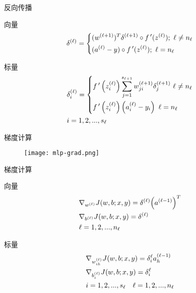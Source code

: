 \begin{frame}{反向传播}
\begin{block}{向量}
\[{\delta ^{(\ell)}} = \left\{ \begin{gathered}
  {({w^{(\ell + 1)}})^T}{\delta ^{(\ell + 1)}} \circ f\,'({z^{(\ell)}});{\text{  }}\ell \ne {n_\ell} \hfill \\
  ({a^{(\ell)}} - y) \circ f\,'({z^{(\ell)}}); {\text{  }}\ell = {n_\ell} \hfill \\ 
\end{gathered}  \right.\]
\end{block}

\begin{block}{标量}
\[\begin{gathered}
  \delta _i^{(\ell )} = \left\{ \begin{gathered}
  f\,'\left( {z_i^{(\ell )}} \right)\sum\limits_{j = 1}^{{s_{\ell  + 1}}} {w_{ji}^{(\ell  + 1)}\delta _j^{(\ell  + 1)}} {\text{   }}\ell  \ne {n_\ell } \hfill \\
  f\,'\left( {z_i^{(\ell )}} \right)\left( {a_i^{(\ell )} - {y_i}} \right){\text{       }}\ell  = {n_\ell } \hfill \\ 
\end{gathered}  \right. \hfill \\
  i = 1,2,...,{s_\ell } \hfill \\ 
\end{gathered} \]
\end{block}
\end{frame}

\begin{frame}{梯度计算}
  \begin{figure}
    \centering
    \texttt{[image: mlp-grad.png]}
  \end{figure}
\end{frame}

\begin{frame}{梯度计算}
\begin{block}{向量}
\[\begin{gathered}
  {\nabla _{{w^{(\ell )}}}}J(w,b;x,y) = {\delta ^{(\ell )}}{\left( {{a^{(\ell  - 1)}}} \right)^T} \hfill \\
  {\nabla _{{b^{(\ell )}}}}J(w,b;x,y) = {\delta ^{(\ell )}} \hfill \\
  \ell  = 1,2,...,{n_\ell } \hfill \\ 
\end{gathered} \]
\end{block}

\begin{block}{标量}
\[\begin{gathered}
  {\nabla _{w_{ih}^{(\ell )}}}J(w,b;x,y) = \delta _i^\ell a_h^{(\ell  - 1)} \hfill \\
  {\nabla _{b_i^{(\ell )}}}J(w,b;x,y) = \delta _i^\ell  \hfill \\
  i = 1,2,...,{s_\ell } \quad \ell  = 1,2,...,{n_\ell } \hfill \\ 
\end{gathered} \]
\end{block}
\end{frame}

